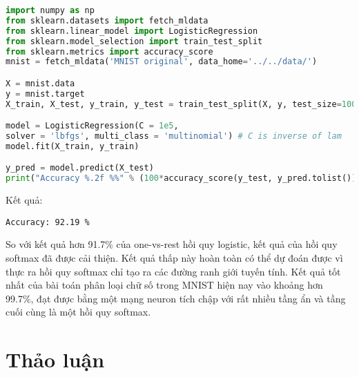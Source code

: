 


\begin{lstlisting}[language=Python]
import numpy as np
from sklearn.datasets import fetch_mldata
from sklearn.linear_model import LogisticRegression
from sklearn.model_selection import train_test_split
from sklearn.metrics import accuracy_score
mnist = fetch_mldata('MNIST original', data_home='../../data/')

X = mnist.data
y = mnist.target
X_train, X_test, y_train, y_test = train_test_split(X, y, test_size=10000)

model = LogisticRegression(C = 1e5,
solver = 'lbfgs', multi_class = 'multinomial') # C is inverse of lam
model.fit(X_train, y_train)

y_pred = model.predict(X_test)
print("Accuracy %.2f %%" % (100*accuracy_score(y_test, y_pred.tolist())))
\end{lstlisting}
Kết quả:
\begin{lstlisting}
Accuracy: 92.19 %
\end{lstlisting}

So với kết quả hơn 91.7\% của one-vs-rest hồi quy logistic, kết quả
của hồi quy softmax đã được cải thiện. Kết quả thấp này hoàn toàn có thể dự đoán được vì thực ra hồi quy softmax chỉ tạo ra các đường
ranh giới tuyến tính. Kết quả tốt nhất của bài toán phân loại chữ
số trong MNIST hiện nay vào khoảng hơn 99.7\%, đạt được bằng một mạng neuron tích chập với rất nhiều tầng ẩn và tầng cuối cùng là một
hồi quy softmax.


\section{Thảo luận }

